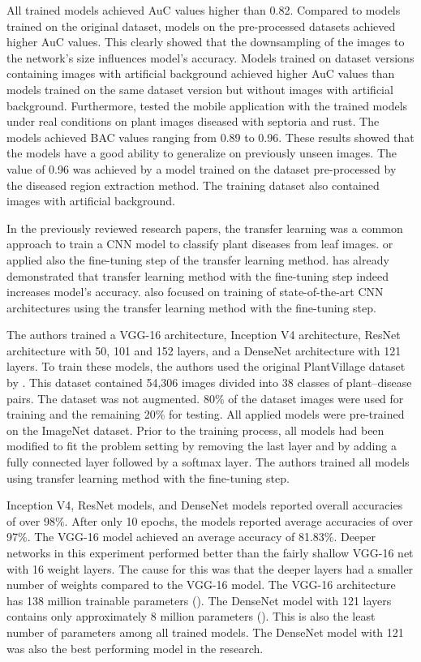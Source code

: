 \documentclass{BachelorBUI}
\begin{document}
        All trained models achieved AuC values higher than 0.82. Compared to models trained on the original dataset, models on the pre-processed datasets achieved higher AuC values. This clearly showed that the downsampling of the images to the network's size influences model's accuracy. Models trained on dataset versions containing images with artificial background achieved higher AuC values than models trained on the same dataset version but without images with artificial background. Furthermore, \textcite{Picon:2019} tested the mobile application with the trained models under real conditions on plant images diseased with septoria and rust. The models achieved BAC values ranging from  0.89 to 0.96. These results showed that the models have a good ability to generalize on previously unseen images. The value of 0.96 was achieved by a model trained on the dataset pre-processed by the diseased region extraction method. The training dataset also contained images with artificial background.    

        In the previously reviewed research papers, the transfer learning was a common approach to train a CNN model to classify plant diseases from leaf images. \textcite{Mohanty:2016} or \textcite{Picon:2019} applied also the fine-tuning step of the transfer learning method. \textcite{Mohanty:2016} has already demonstrated that transfer learning method with the fine-tuning step indeed increases model's accuracy. \textcite{Too:2019} also focused on training of state-of-the-art CNN architectures using the transfer learning method with the fine-tuning step. 
        
        The authors trained a VGG-16 architecture, Inception V4 architecture, ResNet architecture with 50, 101 and 152 layers, and a DenseNet architecture with 121 layers. To train these models, the authors used the original PlantVillage dataset by \textcite{Hughes:2015}. This dataset contained 54,306 images divided into 38 classes of plant--disease pairs. The dataset was not augmented. 80\% of the dataset images were used for training and the remaining 20\% for testing. All applied models were pre-trained on the ImageNet dataset. Prior to the training process, all models had been modified to fit the problem setting by removing the last layer and by adding a fully connected layer followed by a softmax layer. The authors trained all models using transfer learning method with the fine-tuning step. 

        Inception V4, ResNet models, and DenseNet models reported overall accuracies of over 98\%. After only 10 epochs, the models reported average accuracies of over 97\%. The VGG-16 model achieved an average accuracy of 81.83\%. Deeper networks in this experiment performed better than the fairly shallow VGG-16 net with 16 weight layers. The cause for this was that the deeper layers had a smaller number of weights compared to the VGG-16 model. The VGG-16 architecture has 138 million trainable parameters (\cite{Simonyan:2015}). The DenseNet model with 121 layers contains only approximately 8 million parameters (\cite{Huang:2017}). This is also the least number of parameters among all trained models. The DenseNet model with 121 was also the best performing model in the research. 
        
\end{document}
